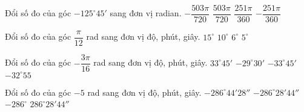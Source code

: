 \begin{ex}%
Đổi số đo của góc $-125^{\circ}45'$ sang đơn vị radian.
\choice
{\True $-\dfrac{503\pi}{720}$}
{$\dfrac{503\pi}{720}$}
{$\dfrac{251\pi}{360}$}
{$-\dfrac{251\pi}{360}$}
\end{ex}

\begin{ex}%
Đổi số đo của góc $\dfrac{\pi}{12}$ rad sang đơn vị độ, phút, giây.
\choice
{\True $15^{\circ}$}
{$10^{\circ}$}
{$6^{\circ}$}
{$5^{\circ}$}
\end{ex}

\begin{ex}%
Đổi số đo của góc $-\dfrac{3\pi}{16}$ rad sang đơn vị độ, phút, giây.
\choice
{$33^{\circ}45'$}
{$-29^{\circ}30'$}
{\True $-33^{\circ}45'$}
{$-32^{\circ}55$}
\end{ex}

\begin{ex}%
Đổi số đo của góc $-5$ rad sang đơn vị độ, phút, giây.
\choice
{$-286^{\circ}44'28''$}
{\True $-286^{\circ}28'44''$}
{$-286^{\circ}$}
{$286^{\circ}28'44''$}
\end{ex}

